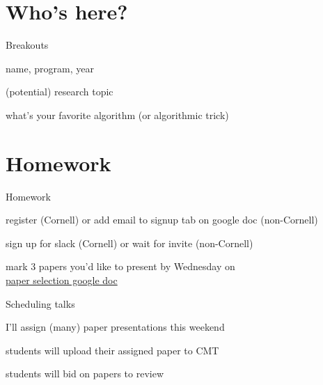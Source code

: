 \documentclass[presentation,xcolor={usenames,dvipsnames}]{beamer}
\begin{document}
\section{Who's here?}

\begin{frame}{Breakouts}

\bit
\item name, program, year
\item (potential) research topic
\item what's your favorite algorithm (or algorithmic trick)
\eit

\end{frame}

\section{Homework}

\begin{frame}{Homework}

\bit
\item register (Cornell) or add email to signup tab on google doc (non-Cornell)
\item sign up for slack (Cornell) or wait for invite (non-Cornell)
\item mark 3 papers you'd like to present by Wednesday on \\
\href{https://docs.google.com/spreadsheets/d/1dhp6D9WJpbvqckGtqw_cDgwzxyPobItjU80ZpkdjhWA}{paper selection google doc}
\eit

\end{frame}

\begin{frame}{Scheduling talks}

\bit
\item I'll assign (many) paper presentations this weekend
\item students will upload their assigned paper to CMT
\item students will bid on papers to review
\eit

\end{frame}
\end{document}
